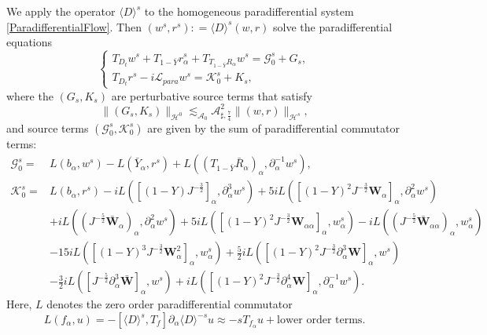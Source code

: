 \documentclass[10pt]{amsart}
\theoremstyle{remark}
\theoremstyle{definition}
\numberwithin{equation}{section}
\newcommand{\p}{\partial}
\renewcommand{\H}{{\mathcal H }}
\newcommand{\al}{\alpha}
\newcommand{\f}{\frac}
\newcommand{\bw}{\mathbf{W}}
\newcommand{\CalAZ}{{\mathcal{A}_0}}
\newcommand{\ASSharp}{{\mathcal{A}_{\sharp,\frac{7}{4}}^2}}
\begin{document}
We apply the operator $\langle D \rangle^s$ to the homogeneous paradifferential system \eqref{ParadifferentialFlow}.
Then $(w^s, r^s): = \langle D\rangle^s(w,r)$ solve the paradifferential equations
\begin{equation}  \label{HsFlowSys}
\begin{cases}
T_{D_t}w^s +T_{1-\bar{Y}}r_{\al}^s+T_{T_{1-\bar{Y}}R_{\al}}w^s= \mathcal{G}^s_0 +G_s,\\
T_{D_t}r^s-i\mathcal{L}_{para}w^s = \mathcal{K}^s_0 +K_s,
\end{cases}
\end{equation}
where the $(G_s, K_s)$ are perturbative source terms that satisfy
\begin{equation}
    \| (G_s, K_s)\|_{\mathcal{H}^0} \lesssim_\CalAZ \ASSharp\|(w,r)\|_{\H^s}, \label{GsHsSource}
\end{equation}
and source terms $(\mathcal{G}^s_0, \mathcal{K}^s_0)$ are given by the sum of paradifferential commutator terms:
\begin{align*}
    \mathcal{G}^s_0 =& L(b_\alpha, w^s)-L(\bar{Y}_\alpha, r^s) + L( (T_{1-\bar{Y}}\bar{R}_\alpha)_\alpha,\partial_\alpha^{-1}w^s) ,\\
    \mathcal{K}^s_0 =& L(b_\alpha, r^s) -iL( [(1-Y)J^{-\f32}]_\al, \p_\al^3 w^s) +5iL([(1-Y)^2J^{-\f32}\bw_\al]_\al, \p_\al^2 w^s)\\
    &+iL((J^{-\f52}\bar{\bw}_\al)_\al, \p_\al^2 w^s) +5iL([(1-Y)^2J^{-\f32}\bw_{\al\al}]_\al,  w^s_\al)- iL((J^{-\f52}\bar{\bw}_{\al\al})_\al, w^s_\al) \\
    &-15i L([(1-Y)^3J^{-\f32}\bw_\al^2]_\al,  w^s_\al) + \f52i L([(1-Y)^2J^{-\f32}\p_\al^3\bw]_\al,  w^s) \\
    &-\f32iL([J^{-\f52}\p_\al^3 \bar{\bw}]_\al, w^s) + iL([(1-Y)^2J^{-\f32}\p_\al^4\bw]_\al,  \p_\al^{-1}w^s).
\end{align*}
Here, $L$ denotes the zero order paradifferential commutator
\begin{equation} \label{LDef}
L(f_\alpha, u) = -[\langle D\rangle^s, T_f]\partial_\alpha \langle D\rangle^{-s}u \approx -sT_{f_\alpha} u + \text{lower order terms}.
\end{equation}
\end{document}
